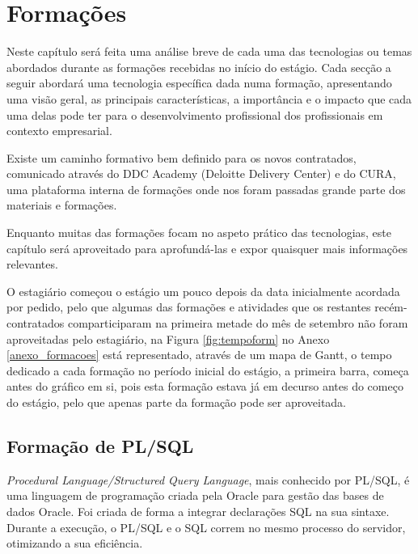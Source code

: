 \section{Formações}\label{sec:formacoes}

    Neste capítulo será feita uma análise breve de cada uma das tecnologias ou temas abordados durante as formações recebidas no início do estágio. Cada secção a seguir abordará uma tecnologia específica dada numa formação, apresentando uma visão geral, as principais características, a importância e o impacto que cada uma delas pode ter para o desenvolvimento profissional dos profissionais em contexto empresarial.

    Existe um caminho formativo bem definido para os novos contratados, comunicado através do DDC Academy (Deloitte Delivery Center) e do CURA, uma plataforma interna de formações onde nos foram passadas grande parte dos materiais e formações.

    Enquanto muitas das formações focam no aspeto prático das tecnologias, este capítulo será aproveitado para aprofundá-las e expor quaisquer mais informações relevantes.

    O estagiário começou o estágio um pouco depois da data inicialmente acordada por pedido, pelo que algumas das formações e atividades que os restantes recém-contratados comparticiparam na primeira metade do mês de setembro não foram aproveitadas pelo estagiário, na Figura \ref{fig:tempoform} no Anexo \ref{anexo_formacoes} está representado, através de um mapa de Gantt, o tempo dedicado a cada formação no período inicial do estágio, a primeira barra, começa antes do gráfico em si, pois esta formação estava já em decurso antes do começo do estágio, pelo que apenas parte da formação pode ser aproveitada.

    \subsection{Formação de PL/SQL}\label{subsec:pl-sql}

      \textit{Procedural Language/Structured Query Language}, mais conhecido por PL/SQL, é uma linguagem de programação criada pela Oracle para gestão das bases de dados Oracle. Foi criada de forma a integrar declarações SQL na sua sintaxe. Durante a execução, o PL/SQL e o SQL correm no mesmo processo do servidor, otimizando a sua eficiência\cite{what-is-pl/sql}.

